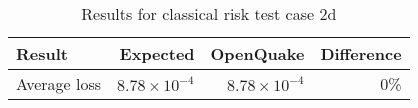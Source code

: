 \begin{table}[htbp]

\centering
\begin{tabular}{ l r r r }

\hline
\rowcolor{anti-flashwhite}
\bf{Result} & \bf{Expected} & \bf{OpenQuake} & \bf{Difference}\\
\hline
Average loss & $8.78 \times 10^{-4}$ & $8.78 \times 10^{-4}$ & 0\% \\
\hline
\end{tabular}

\caption{Results for classical risk test case 2d}
\label{tab:result-classical-risk-2d}
\end{table}
